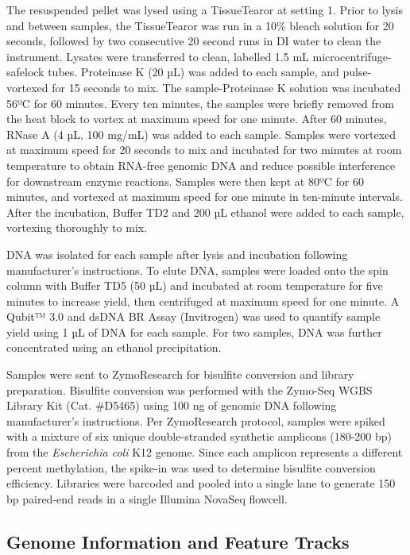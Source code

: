 \documentclass [11pt, proquest] {uwthesis}[2015/03/03]
\begin{document}
The resuspended pellet was lysed using a TissueTearor at setting 1. Prior to lysis and between samples, the TissueTearor was run in a 10\% bleach solution for 20 seconds, followed by two consecutive 20 second runs in DI water to clean the instrument. Lysates were transferred to clean, labelled 1.5 mL microcentrifuge-safelock tubes. Proteinase K (20 µL) was added to each sample, and pulse-vortexed for 15 seconds to mix. The sample-Proteinase K solution was incubated 56ºC for 60 minutes. Every ten minutes, the samples were briefly removed from the heat block to vortex at maximum speed for one minute. After 60 minutes, RNase A (4 µL, 100 mg/mL) was added to each sample. Samples were vortexed at maximum speed for 20 seconds to mix and incubated for two minutes at room temperature to obtain RNA-free genomic DNA and reduce possible interference for downstream enzyme reactions. Samples were then kept at 80ºC for 60 minutes, and vortexed at maximum speed for one minute in ten-minute intervals. After the incubation, Buffer TD2 and 200 µL ethanol were added to each sample, vortexing thoroughly to mix.

DNA was isolated for each sample after lysis and incubation following manufacturer's instructions. To elute DNA, samples were loaded onto the spin column with Buffer TD5 (50 µL) and incubated at room temperature for five minutes to increase yield, then centrifuged at maximum speed for one minute. A Qubit™ 3.0 and dsDNA BR Assay (Invitrogen) was used to quantify sample yield using 1 µL of DNA for each sample. For two samples, DNA was further concentrated using an ethanol precipitation.

Samples were sent to ZymoResearch for bisulfite conversion and library preparation. Bisulfite conversion was performed with the Zymo-Seq WGBS Library Kit (Cat. \#D5465) using 100 ng of genomic DNA following manufacturer's instructions. Per ZymoResearch protocol, samples were spiked with a mixture of six unique double-stranded synthetic amplicons (180-200 bp) from the \emph{Escherichia coli} K12 genome. Since each amplicon represents a different percent methylation, the spike-in was used to determine bisulfite conversion efficiency. Libraries were barcoded and pooled into a single lane to generate 150 bp paired-end reads in a single Illumina NovaSeq flowcell.

\hypertarget{genome-information-and-feature-tracks}{%
\subsection{Genome Information and Feature Tracks}\label{genome-information-and-feature-tracks}}
\end{document}
